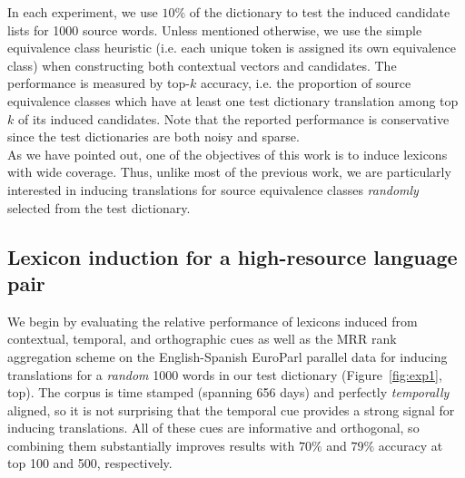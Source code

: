 \documentclass{article}
\newcommand{\figref}[1]{Figure~\ref{#1}}
\begin{document}
In each experiment, we use $10\%$ of the dictionary to test the induced candidate lists for 1000 source words.  Unless mentioned otherwise, we use the simple equivalence class heuristic (i.e. each unique token is assigned its own equivalence class) when constructing both contextual vectors and candidates.  The performance is measured by top-$k$ accuracy, i.e. the proportion of source equivalence classes which have at least one test dictionary translation among top $k$ of its induced candidates.  Note that the reported performance is conservative since the test dictionaries are both noisy and sparse.\\

As we have pointed out, one of the objectives of this work is to induce lexicons with wide coverage.  Thus, unlike most of the previous work, we are particularly interested in inducing translations for source equivalence classes \emph{randomly} selected from the test dictionary. 

\subsection{Lexicon induction for a high-resource language pair}

We begin by evaluating the relative performance of lexicons induced from contextual, temporal, and orthographic cues as well as the MRR rank aggregation scheme on the English-Spanish EuroParl parallel data  for inducing translations for a \emph{random} 1000 words in our test dictionary (\figref{fig:exp1}, top).  The corpus is time stamped (spanning 656 days) and perfectly \emph{temporally} aligned, so it is not surprising that the temporal cue provides a strong signal for inducing translations.  All of these cues are informative and orthogonal, so combining them substantially improves results with $70\%$ and  $79\%$ accuracy at top 100 and 500, respectively.  \\
\end{document}
